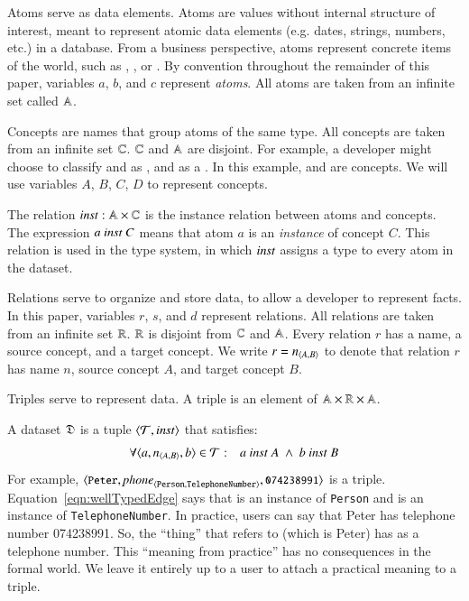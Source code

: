 \documentclass{elsarticle}
\begin{document}
   Atoms serve as data elements.
   Atoms are values without internal structure of interest, meant to represent atomic data elements (e.g. dates, strings, numbers, etc.) in a database.
   From a business perspective, atoms represent concrete items of the world,
   such as , , or .
   By convention throughout the remainder of this paper, variables $a$, $b$, and $c$ represent \emph{atoms}.
   All atoms are taken from an infinite set called $\mathbb{A}$.
   
   Concepts are names that group atoms of the same type.
   All concepts are taken from an infinite set $\mathbb{C}$.
   $\mathbb{C}$ and $\mathbb{A}$ are disjoint.
   For example, a developer might choose to classify  and  as ,
   and  as a .
   In this example,  and  are concepts.
   We will use variables $A$, $B$, $C$, $D$ to represent concepts.

   The relation $\text{\it inst\/}:\mathbb{A}\times\mathbb{C}$ is the instance relation between atoms and concepts.
   The expression $a\ \text{\it inst\/}\ C$ means that atom $a$ is an \emph{instance} of concept $C$.
   This relation is used in the type system, in which $\text{\it inst\/}$ assigns a type to every atom in the dataset.

   Relations serve to organize and store data, to allow a developer to represent facts.
   In this paper, variables $r$, $s$, and $d$ represent relations.
   All relations are taken from an infinite set $\mathbb{R}$.
   $\mathbb{R}$ is disjoint from $\mathbb{C}$ and $\mathbb{A}$.
   Every relation $r$ has a name, a source concept, and a target concept.
   We write $r=\text{\it n\/}_{\langle{A},{B}\rangle}$ to denote that relation $r$ has name $n$, source concept $A$, and target concept $B$.

   Triples serve to represent data.
   A triple is an element of $\mathbb{A}\times\mathbb{R}\times\mathbb{A}$.

   A dataset $\mathfrak{D}$ is a tuple $\langle{\mathcal{T}},{\text{\it inst\/}}\rangle$ that satisfies:
\begin{eqnarray}
   \forall\triple{a}{\declare{n}{A}{B}}{b}\in\triples&:&a\ \inst\ A\ \wedge\ b\ \inst\ B
   \label{eqn:wellTypedEdge}
\end{eqnarray}
   For example, $\langle{\text{{\tt\small Peter}}},{\text{\it \text{\it phone\/}\/}_{\langle{\tt Person},{\tt TelephoneNumber}\rangle}},{\text{{\tt\small 074238991}}}\rangle$ is a triple.
   Equation~\ref{eqn:wellTypedEdge} says that  is an instance of {\tt Person} and  is an instance of {\tt TelephoneNumber}.
   In practice, users can say that Peter has telephone number 074238991.
   So, the ``thing'' that  refers to (which is Peter) has  as a telephone number.
   This ``meaning from practice'' has no consequences in the formal world.
   We leave it entirely up to a user to attach a practical meaning to a triple.
\end{document}

